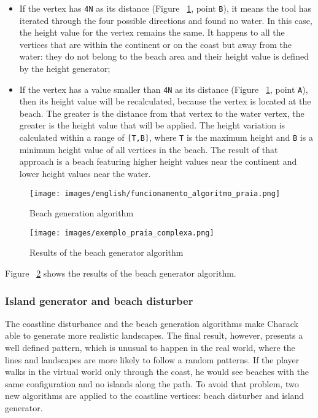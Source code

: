 \documentclass[10pt, conference, compsocconf]{IEEEtran}
\begin{document}
\begin{itemize}
	\item If the vertex has {\tt 4N} as its distance (Figure ~\ref{fig:funcionamento_algoritmo_praia}, point {\tt B}), it means the tool has iterated through the four possible directions and found no water. In this case, the height value for the vertex remains the same. It happens to all the vertices that are within the continent or on the coast but away from the water: they do not belong to the beach area and their height value is defined by the height generator; 
 
	\item If the vertex has a value smaller than {\tt 4N} as its distance (Figure ~\ref{fig:funcionamento_algoritmo_praia}, point {\tt A}), then its height value will be recalculated, because the vertex is located at the beach. The greater is the distance from that vertex to the water vertex, the greater is the height value that will be applied. The height variation is calculated within a range of {\tt [T,B]}, where {\tt T} is the maximum height and {\tt B} is a minimum height value of all vertices in the beach. The result of that approach is a beach featuring higher height values near the continent and lower height values near the water.
\end{itemize}
 
 \begin{figure}
\centering
\texttt{[image: images/english/funcionamento\_algoritmo\_praia.png]}
\caption{Beach generation algorithm}
\label{fig:funcionamento_algoritmo_praia}
\end{figure}
 

\begin{figure}
\centering
\texttt{[image: images/exemplo\_praia\_complexa.png]}
\caption{Results of the beach generator algorithm}
\label{fig:exemplo_praia_simples}
\end{figure}

Figure ~\ref{fig:exemplo_praia_simples} shows the results of the beach generator algorithm.

\subsubsection{Island generator and beach disturber}

The coastline disturbance and the beach generation algorithms make Charack able to generate more realistic landscapes. The final result, however, presents a well defined pattern, which is unusual to happen in the real world, where the lines and landscapes are more likely to follow a random patterns. If the player walks in the virtual world only through the coast, he would see beaches with the same configuration and no islands along the path. To avoid that problem, two new algorithms are applied to the coastline vertices: beach disturber and island generator.
\end{document}

